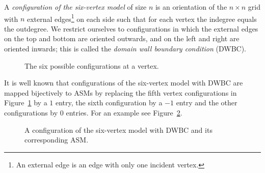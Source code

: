 \documentclass[11pt]{article}
\theoremstyle{definition}
\numberwithin{equation}{section}
\newcounter{x}
\newcounter{y}
\newcounter{z}
\newcommand{\VertexLU}[2]{
\vertcross{#1}{#2}
\LtriangleL{#1}{#2}
\LtriangleR{#1}{#2}
\UtriangleU{#1}{#2}
\UtriangleD{#1}{#2}
}
\newcommand{\VertexLD}[2]{
\vertcross{#1}{#2}
\LtriangleL{#1}{#2}
\LtriangleR{#1}{#2}
\DtriangleU{#1}{#2}
\DtriangleD{#1}{#2}
}
\newcommand{\VertexRU}[2]{
\vertcross{#1}{#2}
\RtriangleL{#1}{#2}
\RtriangleR{#1}{#2}
\UtriangleU{#1}{#2}
\UtriangleD{#1}{#2}
}
\newcommand{\VertexRD}[2]{
\vertcross{#1}{#2}
\RtriangleL{#1}{#2}
\RtriangleR{#1}{#2}
\DtriangleU{#1}{#2}
\DtriangleD{#1}{#2}
}
\newcommand{\VertexOne}[3][black]{
\vertcross{#2}{#3}
\begin{scope}[#1]
\RtriangleL{#2}{#3}
\LtriangleR{#2}{#3}
\UtriangleU{#2}{#3}
\DtriangleD{#2}{#3}
\end{scope}
}
\newcommand{\VertexMinus}[3][black]{
\vertcross{#2}{#3}
\begin{scope}[#1]
\LtriangleL{#2}{#3}
\RtriangleR{#2}{#3}
\DtriangleU{#2}{#3}
\UtriangleD{#2}{#3}
\end{scope}
}
\newcommand{\vertcross}[2]{
\draw[xshift=#1 cm,yshift=#2 cm] (-.85,0) -- (.85,0);
\draw[xshift=#1 cm,yshift=#2 cm] (0,-.85) -- (0,.85);
\draw[fill] (#1,#2) circle [radius=0.07];
}
\newcommand{\RtriangleR}[2]{
\draw[fill, draw=none, xshift=#1 cm,yshift=#2 cm] (.4,.1) -- (.4,-.1) -- (.6,0);
}
\newcommand{\RtriangleL}[2]{
\draw[fill, draw=none, xshift=#1 cm,yshift=#2 cm] (-.6,.1) -- (-.6,-.1) -- (-.4,0);
}
\newcommand{\LtriangleR}[2]{
\draw[fill, draw=none, xshift=#1 cm,yshift=#2 cm] (.6,.1) -- (.6,-.1) -- (.4,0);
}
\newcommand{\LtriangleL}[2]{
\draw[fill, draw=none, xshift=#1 cm,yshift=#2 cm] (-.4,.1) -- (-.4,-.1) -- (-.6,0);
}
\newcommand{\UtriangleU}[2]{
\draw[fill, draw=none, xshift=#1 cm,yshift=#2 cm] (-.1,.4) -- (.1,.4) -- (0,.6);
}
\newcommand{\UtriangleD}[2]{
\draw[fill, draw=none, xshift=#1 cm,yshift=#2 cm] (-.1,-.6) -- (.1,-.6) -- (0,-.4);
}
\newcommand{\DtriangleU}[2]{
\draw[fill, draw=none, xshift=#1 cm,yshift=#2 cm] (-.1,.6) -- (.1,.6) -- (0,.4);
}
\newcommand{\DtriangleD}[2]{
\draw[fill, draw=none, xshift=#1 cm,yshift=#2 cm] (-.1,-.4) -- (.1,-.4) -- (0,-.6);
}
\begin{document}
A \emph{configuration of the six-vertex model} of size $n$ is an orientation of the $n \times n$ grid with $n$ external edges\footnote{An external edge is an edge with only one incident vertex.} on each side such that for each vertex the indegree equals the outdegree. We restrict ourselves to configurations in which the external edges on the top and bottom are oriented outwards, and on the left and right are oriented inwards; this is called the \emph{domain wall boundary condition} (DWBC). 
\begin{figure}
\begin{center}
\caption{\label{fig: 6-vert} The six possible configurations at a vertex.} 
\end{center}
\end{figure}
It is well known that configurations of the six-vertex model with DWBC are mapped bijectively to ASMs by replacing the fifth vertex configurations in Figure~\ref{fig: 6-vert} by a $1$ entry, the sixth configuration by a $-1$ entry and the other configurations by $0$ entries. For an example see Figure~\ref{fig: asm to 6vert}.
\begin{figure}
\begin{center}
\end{center}
\caption{\label{fig: asm to 6vert} A configuration of the six-vertex model with DWBC and its corresponding ASM.}
\end{figure}
\end{document}
